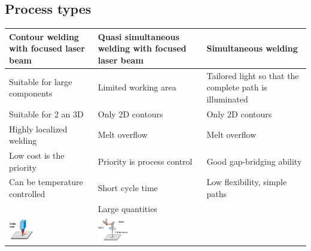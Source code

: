 \subsection{Process types}
\begin{table}[h!]
    \begin{tabular}{|p{} |p{}| p{}|}
        \hline
        \textbf{Contour welding with focused laser beam} & \textbf{Quasi simultaneous welding with focused laser beam} & \textbf{Simultaneous welding} \\
        \hline
        Suitable for large components & Limited working area & Tailored light so that the complete path is illuminated \\
        Suitable for 2 an 3D & Only 2D contours &  Only 2D contours \\
        Highly localized welding & Melt overflow & Melt overflow \\
        Low cost is the priority & Priority is process control  & Good gap-bridging ability \\
        Can be temperature controlled & Short cycle time & Low flexibility, simple paths \\
        & Large quantities & \\
        \includegraphics[width=0.3\textwidth]{slike/conturWeld.png} & \includegraphics[width=0.3\textwidth]{slike/galvoweld.png} & \\
        \hline
    \end{tabular}
\end{table}

\section*{} %